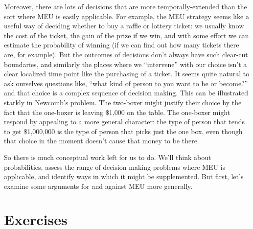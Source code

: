 \documentclass[]{tufte-book}
\begin{document}
Moreover, there are lots of decisions that are more temporally-extended than the sort where MEU is easily applicable. For example, the MEU strategy seems like a useful way of deciding whether to buy a raffle or lottery ticket: we usually know the cost of the ticket, the gain of the prize if we win, and with some effort we can estimate the probability of winning (if we can find out how many tickets there are, for example). But the outcomes of decisions don't always have such clear-cut boundaries, and similarly the places where we ``intervene'' with our choice isn't a clear localized time point like the purchasing of a ticket. It seems quite natural to ask ourselves questions like, ``what kind of person to you want to be or become?'' and that choice is a complex sequence of decision making. This can be illustrated starkly in Newcomb's problem. The two-boxer might justify their choice by the fact that the one-boxer is leaving \$1,000 on the table. The one-boxer might respond by appealing to a more general character: the type of person that tends to get \$1,000,000 is the type of person that picks just the one box, even though that choice in the moment doesn't cause that money to be there.

So there is much conceptual work left for us to do. We'll think about probabilities, assess the range of decision making problems where MEU is applicable, and identify ways in which it might be supplemented. But first, let's examine some arguments for and against MEU more generally.

\hypertarget{exercises-4}{%
\section*{Exercises}\label{exercises-4}}
\end{document}
